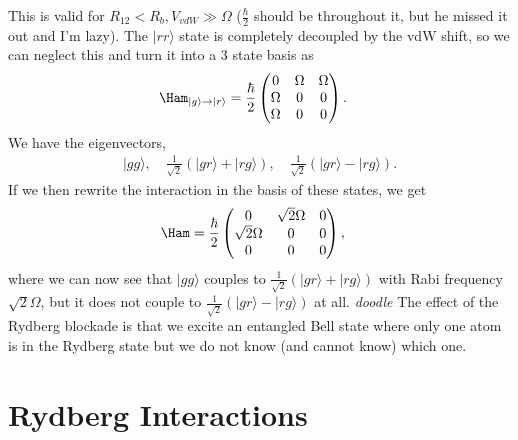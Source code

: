 \documentclass[a4paper, 11pt, normalem]{report}
\begin{document}
This is valid for $R_{12}<R_b,V_{vdW}\gg\Omega$ ($\frac{\hbar}{2}$ should be throughout it, but he missed it out and I'm lazy).
The $|rr\rangle$ state is completely decoupled by the vdW shift, so we can neglect this and turn it into a 3 state basis as
\begin{align}
    \Ham_{|g\rangle\to|r\rangle} &= \frac{\hbar}{2}\begin{pmatrix} 0&\Omega&\Omega\\\Omega&0&0\\\Omega&0&0\end{pmatrix}.
\end{align}
We have the eigenvectors,
\begin{align*}
    |gg\rangle, \quad \frac{1}{\sqrt{2}}\left(|gr\rangle+|rg\rangle\right),\quad \frac{1}{\sqrt{2}}\left(|gr\rangle-|rg\rangle\right).
\end{align*}
If we then rewrite the interaction in the basis of these states, we get
\begin{align}
    \Ham &= \frac{\hbar}{2}\begin{pmatrix} 0 & \sqrt{2}\Omega & 0 \\\sqrt{2}\Omega & 0 & 0 \\ 0 & 0 & 0\end{pmatrix},
\end{align}
where we can now see that $|gg\rangle$ couples to $\frac{1}{\sqrt{2}}(|gr\rangle+|rg\rangle)$ with Rabi frequency $\sqrt{2}\Omega$, but it does not couple to $\frac{1}{\sqrt{2}}(|gr\rangle-|rg\rangle)$ at all.
\emph{doodle}
The effect of the Rydberg blockade is that we excite an entangled Bell state where only one atom is in the Rydberg state but we do not know (and cannot know) which one.

\chapter{Rydberg Interactions}
\end{document}
